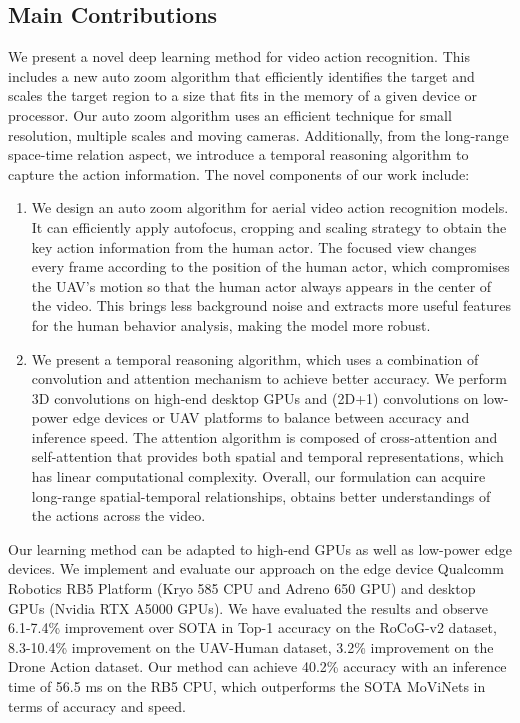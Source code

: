 \documentclass[letterpaper, 10 pt, conference]{ieeeconf}
\begin{document}
\subsection{Main Contributions}
We present a novel deep learning method for video action recognition. This includes a new auto zoom algorithm that efficiently identifies the target and scales the target region to a size that fits in the memory of a given device or processor. Our auto zoom algorithm uses an efficient technique for small resolution, multiple scales and moving cameras. Additionally, from the long-range space-time relation aspect, we introduce a temporal reasoning algorithm to capture the action information. The novel components of our work include:
\begin{enumerate}

\item We design an auto zoom algorithm for aerial video action recognition models. It can efficiently apply autofocus, cropping and scaling strategy to obtain the key action information from the human actor. The focused view changes every frame according to the position of the human actor, which compromises the UAV's motion so that the human actor always appears in the center of the video. This brings less background noise and extracts more useful features for the human behavior analysis, making the model more robust. 

\item We present a temporal reasoning algorithm, which uses a combination of convolution and attention mechanism to achieve better accuracy. We perform 3D convolutions on high-end desktop GPUs and (2D+1) convolutions on low-power edge devices or UAV platforms to balance between accuracy and inference speed. The attention algorithm is composed of cross-attention and self-attention that provides both spatial and temporal representations, which has linear computational complexity. Overall, our formulation can acquire long-range spatial-temporal relationships, obtains better understandings of the actions across the video.

\end{enumerate}
Our learning method can be adapted to high-end GPUs as well as low-power edge devices. We implement and evaluate our approach on the edge device Qualcomm Robotics RB5 Platform (Kryo 585 CPU and Adreno 650 GPU) and desktop GPUs (Nvidia RTX A5000 GPUs). We have evaluated the results and observe 6.1-7.4\% improvement over SOTA in Top-1 accuracy on the RoCoG-v2 dataset, 8.3-10.4\% improvement on the UAV-Human dataset, 3.2\% improvement on the Drone Action dataset. Our method can achieve 40.2\% accuracy with an inference time of 56.5 ms on the RB5 CPU, which outperforms the SOTA MoViNets in terms of accuracy and speed.
\end{document}

